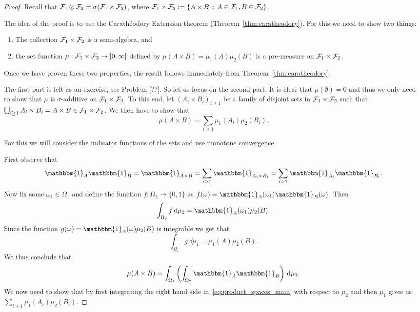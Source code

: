 \begin{proof}
Recall that $\mathcal F_1 \otimes \mathcal F_2 = \sigma(\mathcal F_1 \times \mathcal F_2)$, where $\mathcal F_1 \times \mathcal F_2 := \{A \times B \, : \, A \in \mathcal F_1, B \in \mathcal F_2\}$.

The idea of the proof is to use the Carath\'{e}odory Extension theorem (Theorem~\ref{thm:caratheodory}). For this we need to show two things:
\begin{enumerate}
\item The collection $\mathcal F_1 \times \mathcal F_2$ is a semi-algebra, and
\item the set function $\mu : \mathcal F_1 \times \mathcal F_2 \to [0,\infty]$ defined by $\mu(A \times B) = \mu_1(A) \mu_2(B)$ is a pre-measure on $\mathcal F_1 \times \mathcal F_2$.
\end{enumerate}

Once we have proven these two properties, the result follows immediately from Theorem~\ref{thm:caratheodory}.

The first part is left as an exercise, see Problem [??]. So let us focus on the second part. It is clear that $\mu(\emptyset) = 0$ and thus we only need to show that $\mu$ is $\sigma$-additive on $\mathcal F_1 \times \mathcal F_2$. To this end, let $(A_i \times B_i)_{i \ge 1}$ be a family of disjoint sets in $\mathcal F_1 \times \mathcal F_2$ such that $\bigcup_{i \ge 1} A_i \times B_i = A \times B \in \mathcal F_1 \times \mathcal F_2$. We then have to show that
\[
	\mu(A \times B) = \sum_{i \ge 1} \mu_1(A_i) \mu_2(B_i).
\]

For this we will consider the indicator functions of the sets and use monotone convergence. 

First observe that
\begin{equation}\label{eq:product_spaces_main}
	\mathbbm{1}_{A} \mathbbm{1}_{B} = \mathbbm{1}_{A \times B} 
	= \sum_{i \ge 1} \mathbbm{1}_{A_i \times B_i} = \sum_{i \ge 1} \mathbbm{1}_{A_i} \mathbbm{1}_{B_i}.
\end{equation}
Now fix some $\omega_1 \in \Omega_1$ and define the function $f : \Omega_2 \to \{0,1\}$ as $f(\omega) = \mathbbm{1}_{A}(\omega_1) \mathbbm{1}_{B}(\omega)$. Then
\[
	\int_{\Omega_2} f \, \dd \mu_2 = \mathbbm{1}_{A}(\omega_1) \mu_2(B).
\]
Since the function $g(\omega) = \mathbbm{1}_{A}(\omega) \mu_2(B)$ is integrable we get that
\[
	\int_{\Omega_1} g \, \dd \mu_1 = \mu_1(A) \mu_2(B).
\]
We thus conclude that
\[
	\mu(A \times B) = \int_{\Omega_1} \left(\int_{\Omega_2} \mathbbm{1}_{A} \mathbbm{1}_{B} \right) \, \dd \mu_1.
\]
We now need to show that by first integrating the right hand side in~\eqref{eq:product_spaces_main} with respect to $\mu_2$ and then $\mu_1$ gives us $\sum_{i \ge 1} \mu_1(A_i) \mu_2(B_i)$.


\end{proof}
